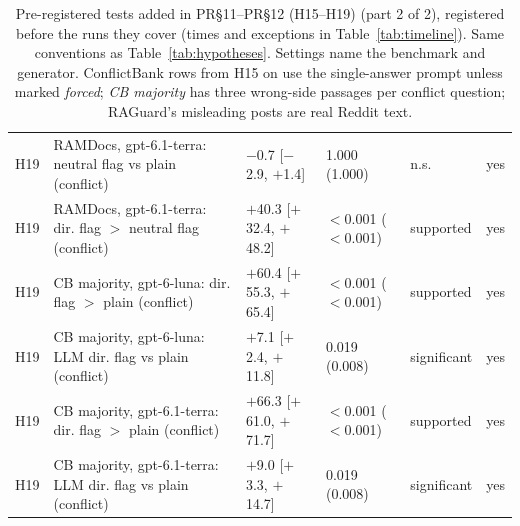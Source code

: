 \begin{table}[p]
{\begin{tabular}{lp{6.6cm}llll}
H19 & RAMDocs, gpt-6.1-terra: neutral flag vs plain (conflict) & $-$0.7 [$-$2.9, $+$1.4] & 1.000 (1.000) & n.s. & yes \\
H19 & RAMDocs, gpt-6.1-terra: dir. flag $>$ neutral flag (conflict) & $+$40.3 [$+$32.4, $+$48.2] & $<$0.001 ($<$0.001) & supported & yes \\
H19 & CB majority, gpt-6-luna: dir. flag $>$ plain (conflict) & $+$60.4 [$+$55.3, $+$65.4] & $<$0.001 ($<$0.001) & supported & yes \\
H19 & CB majority, gpt-6-luna: LLM dir. flag vs plain (conflict) & $+$7.1 [$+$2.4, $+$11.8] & 0.019 (0.008) & significant & yes \\
H19 & CB majority, gpt-6.1-terra: dir. flag $>$ plain (conflict) & $+$66.3 [$+$61.0, $+$71.7] & $<$0.001 ($<$0.001) & supported & yes \\
H19 & CB majority, gpt-6.1-terra: LLM dir. flag vs plain (conflict) & $+$9.0 [$+$3.3, $+$14.7] & 0.019 (0.008) & significant & yes \\
\bottomrule
\end{tabular}}
\caption{Pre-registered tests added in PR\S11--PR\S12 (H15--H19) (part 2 of 2), registered before the runs they cover (times and exceptions in
Table~\ref{tab:timeline}). Same conventions as
Table~\ref{tab:hypotheses}. Settings name the benchmark and generator. ConflictBank rows from H15 on use the
single-answer prompt unless marked \emph{forced}; \emph{CB majority} has three wrong-side passages per conflict
question; RAGuard's misleading posts are real Reddit text.}
\label{tab:hypotheses5}
\end{table}

